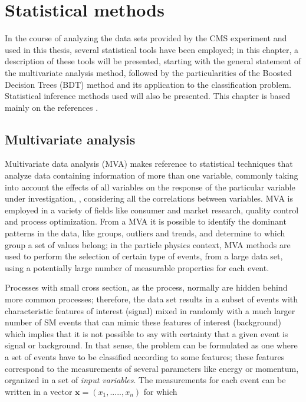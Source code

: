 \chapter{Statistical methods}\label{ch:stat}

In the course of analyzing the data sets provided by the CMS experiment and used in this thesis, several statistical tools have been employed; in this chapter, a description of these tools will be presented, starting with the general statement of the multivariate analysis method, followed by the particularities of the Boosted Decision Trees (BDT) method and its application to the classification problem. Statistical inference methods used will also be presented. This chapter is based mainly on the references \cite{mva, tmva, luca}.      

\section{Multivariate analysis}\label{sec:mva}

Multivariate data analysis (MVA) makes reference to statistical techniques that analyze data containing information of more than one variable, commonly taking into account the effects of all variables on the response of the particular variable under investigation, \ie, considering all the correlations between variables. MVA is employed in a variety of fields like consumer and market research, quality control and process optimization. From a MVA it is possible to identify the dominant patterns in the data, like groups, outliers and trends, and determine to which group a set of values belong; in the particle physics context, MVA methods are used to perform the selection of certain type of events, from a large data set, using a potentially large number of measurable properties for each event.

Processes with small cross section, as the \tHq process, normally are hidden behind more common processes; therefore, the data set results in a subset of events with characteristic features of interest (signal) mixed in randomly with a much larger number of SM events that can mimic these features of interest (background) which implies that it is not possible to say with certainty that a given event is signal or background. In that sense, the problem can be formulated as one where a set of events have to be classified according to some features; these features correspond to the measurements of several parameters like energy or momentum, organized in a set of \textit{input variables}. The measurements for each event can be written in a vector $\textbf{x}=(x_1,.....,x_n)$ for which

